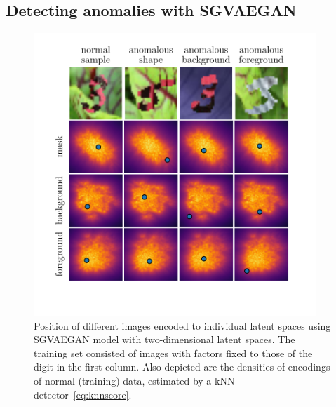 \subsection{Detecting anomalies with SGVAEGAN} \label{sec:anomaly_detection}

\begin{figure}[ht!]
    \centering
        \includegraphics[width=0.95\textwidth]{data/chapter_sgvaegan/latent_decomposition_example.pdf}
    \caption{Position of different images encoded to individual latent spaces using SGVAEGAN model with two-dimensional latent spaces. The training set consisted of images with factors fixed to those of the digit in the first column. Also depicted are the densities of encodings of normal (training) data, estimated by a kNN detector~\eqref{eq:knnscore}.}
    \label{fig:latent_decomposition_example}
\end{figure}

